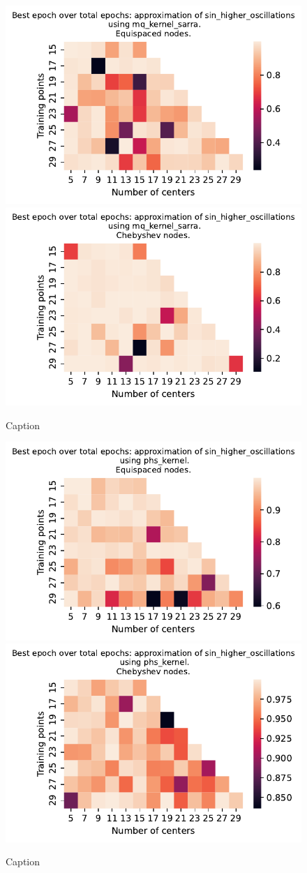 \documentclass[12pt]{report} %
\begin{document}
\begin{figure}[ht]
  \centering

  \includegraphics[width=.49\textwidth]{imagenes/experiments/1d/variational_epochs/sin_higher_oscillations-Kmq_kernel_sarra-Equi-epochs.pdf}
  \includegraphics[width=.49\textwidth]{imagenes/experiments/1d/variational_epochs/sin_higher_oscillations-Kmq_kernel_sarra-Cheb-epochs.pdf}
  \caption{Caption}
  \label{fig:epochs-sin-higher-oscillations-sarra}
\end{figure}

\begin{figure}[ht]
  \centering

  \includegraphics[width=.49\textwidth]{imagenes/experiments/1d/variational_epochs/sin_higher_oscillations-Kphs_kernel-Equi-epochs.pdf}
  \includegraphics[width=.49\textwidth]{imagenes/experiments/1d/variational_epochs/sin_higher_oscillations-Kphs_kernel-Cheb-epochs.pdf}
  \caption{Caption}
  \label{fig:epochs-sin-higher-oscillations-phs}
\end{figure}
\end{document}
